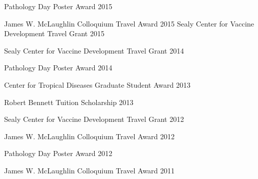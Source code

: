 \begin{cvhonors}

  \cvhonor
    {Pathology Day Poster Award} %
    {} %
    {} %
    {2015} %

  \cvhonor
    {James W. McLaughlin Colloquium Travel Award} %
    {} %
    {} %
    {2015} %
  \cvhonor
    {Sealy Center for Vaccine Development Travel Grant} %
    {} %
    {} %
    {2015} %

  \cvhonor
    {Sealy Center for Vaccine Development Travel Grant} %
    {} %
    {} %
    {2014} %

  \cvhonor
    {Pathology Day Poster Award} %
    {} %
    {} %
    {2014} %
    
  \cvhonor
    {Center for Tropical Diseases Graduate Student Award} %
    {} %
    {} %
    {2013} %
    
  \cvhonor
    {Robert Bennett Tuition Scholarship} %
    {} %
    {} %
    {2013} %
    
  \cvhonor
    {Sealy Center for Vaccine Development Travel Grant} %
    {} %
    {} %
    {2012} %
    
  \cvhonor
    {James W. McLaughlin Colloquium Travel Award} %
    {} %
    {} %
    {2012} %
    
  \cvhonor
    {Pathology Day Poster Award} %
    {} %
    {} %
    {2012} %
    
  \cvhonor
    {James W. McLaughlin Colloquium Travel Award} %
    {} %
    {} %
    {2011} %
\end{cvhonors}
